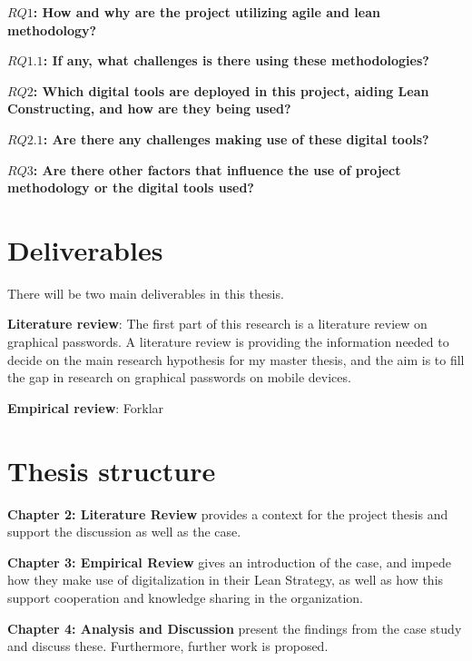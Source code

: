 {\noindent \bf $RQ1$: How and why are the project utilizing agile and lean methodology?}

{\indent \bf $RQ1.1$: If any, what challenges is there using these methodologies?}

{\noindent \bf $RQ2$: Which digital tools are deployed in this project, aiding Lean Constructing, and how are they being used?}

{\indent \bf $RQ2.1$: Are there any challenges making use of these digital tools?}

{\noindent \bf $RQ3$: Are there other factors that influence the use of project methodology or the digital tools used?}

\section{Deliverables} \label{sec:deliverables}
There will be two main deliverables in this thesis.

{\noindent \bf Literature review}: The first part of this research is a literature review on graphical passwords. A literature review is providing the information needed to decide on the main research hypothesis for my master thesis, and the aim is to fill the gap in research on graphical passwords on mobile devices.

{\noindent \bf Empirical review}: Forklar

\section{Thesis structure} \label{sec:thesis}

{\noindent \bf Chapter 2: Literature Review} provides a context for the project thesis and support the discussion as well as the case.

{\noindent \bf Chapter 3: Empirical Review} gives an introduction of the case, and impede how they make use of digitalization in their Lean Strategy, as well as how this support cooperation and knowledge sharing in the organization.

{\noindent \bf Chapter 4: Analysis and Discussion} present the findings from the case study and discuss these. Furthermore, further work is proposed. 


\cleardoublepage